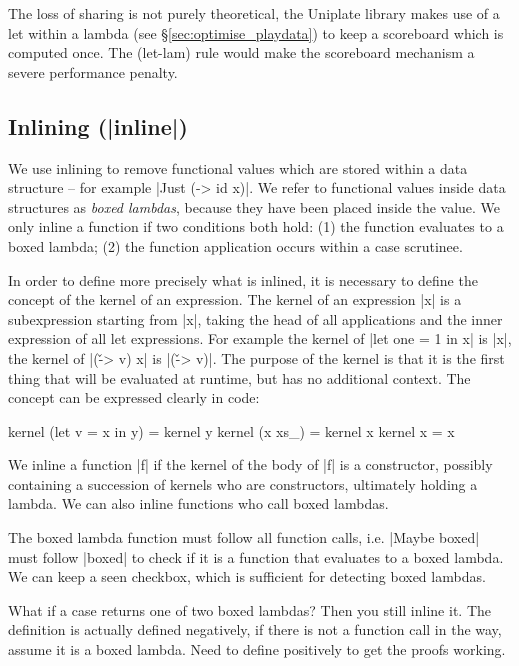 \documentclass[preprint]{sigplanconf}
\begin{document}
The loss of sharing is not purely theoretical, the Uniplate library \cite{uniplate} makes use of a let within a lambda (see \S\ref{sec:optimise_playdata}) to keep a scoreboard which is computed once. The (let-lam) rule would make the scoreboard mechanism a severe performance penalty.

\subsection{Inlining (|inline|)}

We use inlining to remove functional values which are stored within a data structure -- for example |Just (\x -> id x)|. We refer to functional values inside data structures as \textit{boxed lambdas}, because they have been placed inside the value. We only inline a function if two conditions both hold: (1) the function evaluates to a boxed lambda; (2) the function application occurs within a case scrutinee.

In order to define more precisely what is inlined, it is necessary to define the concept of the kernel of an expression. The kernel of an expression |x| is a subexpression starting from |x|, taking the head of all applications and the inner expression of all let expressions. For example the kernel of |let one = 1 in x| is |x|, the kernel of |(\v -> v) x| is |(\v -> v)|. The purpose of the kernel is that it is the first thing that will be evaluated at runtime, but has no additional context. The concept can be expressed clearly in code:

\begin{code}
kernel (let v = x in y)  = kernel y
kernel (x xs_)           = kernel x
kernel x                 = x
\end{code}

We inline a function |f| if the kernel of the body of |f| is a constructor, possibly containing a succession of kernels who are constructors, ultimately holding a lambda. We can also inline functions who call boxed lambdas.

The boxed lambda function must follow all function calls, i.e. |Maybe boxed| must follow |boxed| to check if it is a function that evaluates to a boxed lambda. We can keep a seen checkbox, which is sufficient for detecting boxed lambdas.

What if a case returns one of two boxed lambdas? Then you still inline it. The definition is actually defined negatively, if there is not a function call in the way, assume it is a boxed lambda. Need to define positively to get the proofs working.
\end{document}
